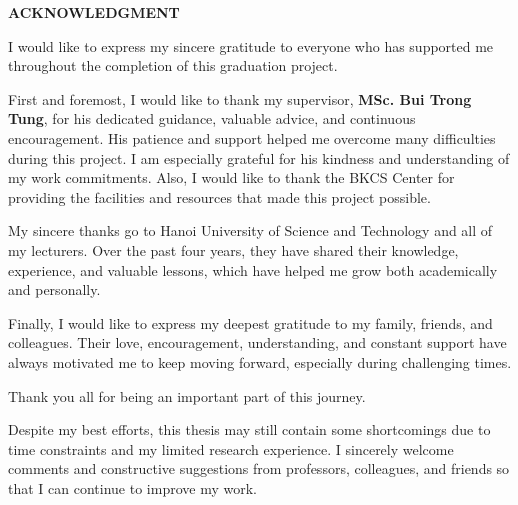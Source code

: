 \documentclass[../main.tex]{subfiles}
\begin{document}
\begin{center}
    \Large\textbf{ACKNOWLEDGMENT}
\end{center}
\vspace{1cm}

I would like to express my sincere gratitude to everyone who has supported me throughout the completion of this graduation project.

First and foremost, I would like to thank my supervisor, \textbf{MSc. Bui Trong Tung}, for his dedicated guidance, valuable advice, and continuous encouragement. His patience and support helped me overcome many difficulties during this project. I am especially grateful for his kindness and understanding of my work commitments. Also, I would like to thank the BKCS Center for providing the facilities and resources that made this project possible.

My sincere thanks go to Hanoi University of Science and Technology and all of my lecturers. Over the past four years, they have shared their knowledge, experience, and valuable lessons, which have helped me grow both academically and personally.

Finally, I would like to express my deepest gratitude to my family, friends, and colleagues. Their love, encouragement, understanding, and constant support have always motivated me to keep moving forward, especially during challenging times.

Thank you all for being an important part of this journey.

Despite my best efforts, this thesis may still contain some shortcomings due to time constraints and my limited research experience. I sincerely welcome comments and constructive suggestions from professors, colleagues, and friends so that I can continue to improve my work.
\end{document}

